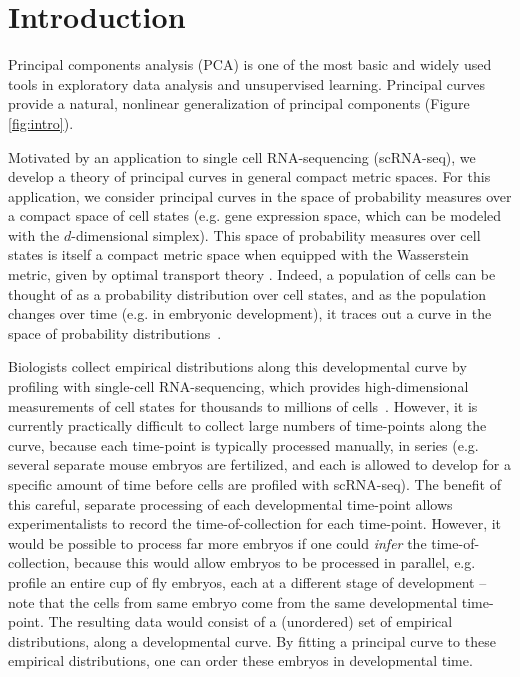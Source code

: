 \documentclass[aos, preprint]{imsart}
\theoremstyle{plain}
\theoremstyle{remark}
\begin{document}
\section{Introduction}
\label{sec:intro}

Principal components analysis (PCA) is one of the most basic and widely used tools in exploratory data analysis and unsupervised learning. Principal curves~\cite{hastie1989} provide a natural, nonlinear generalization of principal components (Figure \ref{fig:intro}).

Motivated by an application to single cell RNA-sequencing (scRNA-seq), we develop a theory of principal curves in general compact metric spaces.
For this application, we consider principal curves in the space of probability measures over a compact space of cell states (e.g. gene expression space, which can be modeled with the $d$-dimensional simplex). This space of probability measures over cell states is itself a compact metric space when equipped with the Wasserstein metric, given by
optimal transport theory \cite{ambrosio2013user, villani2008optimal}.
Indeed, a population of cells can be thought of as a probability distribution over cell states, and as the population changes over time (e.g. in embryonic development), it traces out a curve in the space of probability distributions~\cite{lavenant2024towards,schiebinger2021opinion}.

Biologists collect empirical distributions along this developmental curve by profiling with single-cell RNA-sequencing, which provides high-dimensional measurements of cell states for thousands to millions of cells~\cite{schiebinger2019optimal,lavenant2024towards,schiebinger2021opinion}.
However, it is currently practically difficult to collect large numbers of time-points along the curve, because each time-point is typically processed manually, in series (e.g. several separate mouse embryos are fertilized, and each is allowed to develop for a specific amount of time before cells are profiled with scRNA-seq).
The benefit of this careful, separate processing of each developmental time-point allows experimentalists to record the time-of-collection for each time-point.
However, it would be possible to process far more embryos if one could {\em infer} the time-of-collection, because this would allow embryos to be processed in parallel, e.g. profile an entire cup of fly embryos, each at a different stage of development -- note that the  cells from same embryo come from the same developmental time-point.
The resulting data would consist of a (unordered) set of empirical distributions, along a developmental curve.
By fitting a principal curve to these empirical distributions, one can order these embryos in developmental time.
\end{document}
